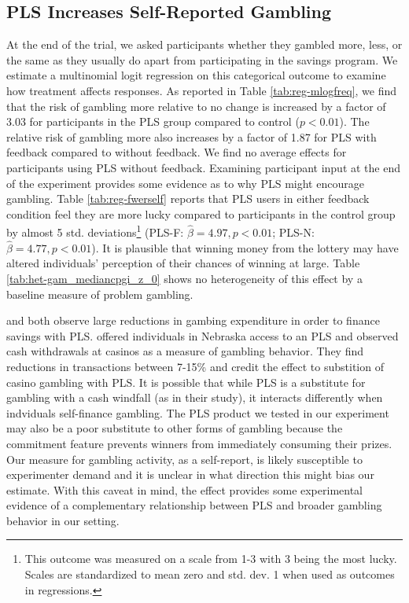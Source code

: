 \documentclass[12pt]{article}
\begin{document}
		

	\subsection{PLS Increases Self-Reported Gambling}

		At the end of the trial, we asked participants whether they gambled more, less, or the same as they usually do apart from participating in the savings program. We estimate a multinomial logit regression on this categorical outcome to examine how treatment affects responses. As reported in Table \ref{tab:reg-mlogfreq}, we find that the risk of gambling more relative to no change is increased by a factor of 3.03 for participants in the PLS group compared to control ($p < 0.01$). The relative risk of gambling more also increases by a factor of 1.87 for PLS with feedback compared to without feedback. We find no average effects for participants using PLS without feedback. Examining participant input at the end of the experiment provides some evidence as to why PLS might encourage gambling. Table \ref{tab:reg-fwerself} reports that PLS users in either feedback condition feel they are more lucky compared to participants in the control group by almost 5 std. deviations\footnote{This outcome was measured on a scale from 1-3 with 3 being the most lucky. Scales are standardized to mean zero and std. dev. 1 when used as outcomes in regressions.} (PLS-F: $\hat \beta = 4.97, p < 0.01$; PLS-N: $\hat \beta = 4.77, p < 0.01$). It is plausible that winning money from the lottery may have altered individuals' perception of their chances of winning at large. Table \ref{tab:het-gam_mediancpgi_z_0} shows no heterogeneity of this effect by a baseline measure of problem gambling.

		\textcite{atalay_savings_2014} and \textcite{dizon_leveraging_2016} both observe large reductions in gambing expenditure in order to finance savings with PLS. \textcite{cookson_when_2016} offered individuals in Nebraska access to an PLS and observed cash withdrawals at casinos as a measure of gambling behavior. They find reductions in transactions between 7-15\% and credit the effect to substition of casino gambling with PLS. It is possible that while PLS is a substitute for gambling with a cash windfall (as in their study), it interacts differently when indviduals self-finance gambling. The PLS product we tested in our experiment may also be a poor substitute to other forms of gambling because the commitment feature prevents winners from immediately consuming their prizes. Our measure for gambling activity, as a self-report, is likely susceptible to experimenter demand and it is unclear in what direction this might bias our estimate. With this caveat in mind, the effect provides some experimental evidence of a complementary relationship between PLS and broader gambling behavior in our setting.
\end{document}
